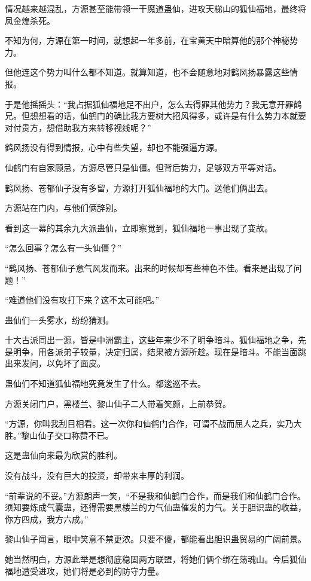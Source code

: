\begin{this_body}
情况越来越混乱，方源甚至能带领一干魔道蛊仙，进攻天梯山的狐仙福地，最终将凤金煌杀死。

不知为何，方源在第一时间，就想起一年多前，在宝黄天中暗算他的那个神秘势力。

但他连这个势力叫什么都不知道。就算知道，也不会随意地对鹤风扬暴露这些情报。

于是他摇摇头：“我占据狐仙福地足不出户，怎么去得罪其他势力？我无意开罪鹤兄。但想想看的话，仙鹤门的确比我方要树大招风得多，或许是有什么势力本就要对付贵方，想借助我方来转移视线呢？”

鹤风扬没有得到情报，心中有些失望，却也不能强逼方源。

仙鹤门有自家顾忌，方源尽管只是仙僵。但背后势力，足够双方平等对话。

鹤风扬、苍郁仙子没有多留，方源打开狐仙福地的大门。送他们俩出去。

方源站在门内，与他们俩辞别。

看到这一幕的其余九大派蛊仙，立即察觉到，狐仙福地一事出现了变故。

“怎么回事？怎么有一头仙僵？”

“鹤风扬、苍郁仙子意气风发而来。出来的时候却有些神色不佳。看来是出现了问题！”

“难道他们没有攻打下来？这不太可能吧。”

蛊仙们一头雾水，纷纷猜测。

十大古派同出一源，皆是中洲霸主，这些年来少不了明争暗斗。狐仙福地之争，先是明争，用各派弟子较量，决定归属，结果被方源所趁。现在是暗斗。不能当面跳出来发问，以免坏了面皮。

蛊仙们不知道狐仙福地究竟发生了什么。都逡巡不去。

方源关闭门户，黑楼兰、黎山仙子二人带着笑颜，上前恭贺。

“方源，你叫我刮目相看。这一次你和仙鹤门合作，可谓不战而屈人之兵，实乃大胜。”黎山仙子交口称赞不已。

这是蛊仙向来最为欣赏的胜利。

没有战斗，没有巨大的投资，却带来丰厚的利润。

“前辈说的不妥。”方源朗声一笑，“不是我和仙鹤门合作，而是我们和仙鹤门合作。须知要炼成气囊蛊，还得需要黑楼兰的力气仙蛊催发的力气。关于胆识蛊的收益，你方四成，我方六成。”

黎山仙子闻言，眼中笑意不禁更浓。只要不傻，都能看出胆识蛊贸易的广阔前景。

她当然明白，方源此举是想彻底稳固两方联盟，将她们俩个绑在荡魂山。今后狐仙福地遭受进攻，她们将是必到的防守力量。


\end{this_body}
